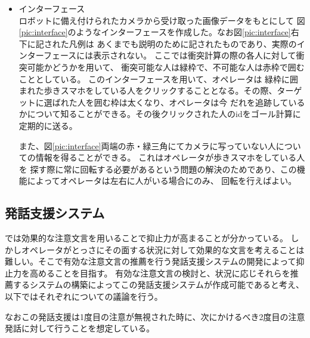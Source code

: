 \documentclass{kuisthesis}
\begin{document}
\begin{itemize}
  \item インターフェース \\
  \quad ロボットに備え付けられたカメラから受け取った画像データをもとにして
  図\ref{pic:interface}のようなインターフェースを作成した。なお図\ref{pic:interface}右下に記された凡例は
  あくまでも説明のために記されたものであり、実際のインターフェースには表示されない。
  ここでは衝突計算の際の各人に対して衝突可能かどうかを用いて、
  衝突可能な人は緑枠で、不可能な人は赤枠で囲むこととしている。
  このインターフェースを用いて、オペレータは
  緑枠に囲まれた歩きスマホをしている人をクリックすることとなる。その際、ターゲットに選ばれた人を囲む枠は太くなり、オペレータは今
  だれを追跡しているかについて知ることができる。その後クリックされた人のidをゴール計算に定期的に送る。
  
  \quad また、図\ref{pic:interface}両端の赤・緑三角にてカメラに写っていない人についての情報を得ることができる。
  これはオペレータが歩きスマホをしている人を
  探す際に常に回転する必要があるという問題の解決のためであり、この機能によってオペレータは左右に人がいる場合にのみ、
  回転を行えばよい。
  
\end{itemize}
\vspace{5mm}







\subsection{発話支援システム}
\cite{Schneider2022}では効果的な注意文言を用いることで抑止力が高まることが分かっている。
しかしオペレータがとっさにその面する状況に対して効果的な文言を考えることは難しい。そこで有効な注意文言の推薦を行う発話支援システムの開発によって抑止力を高めることを目指す。
有効な注意文言の検討と、状況に応じそれらを推薦するシステムの構築によってこの発話支援システムが作成可能であると考え、
以下ではそれぞれについての議論を行う。

なおこの発話支援は1度目の注意が無視された時に、次にかけるべき2度目の注意発話に対して行うことを想定している。
\end{document}
